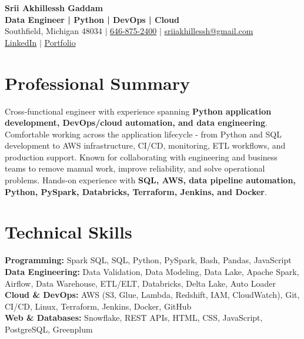 \documentclass[letterpaper,10pt]{article}
\begin{document}
\fontsize{9.35pt}{10.45pt}\selectfont

\begin{center}
    {\LARGE \textbf{Srii Akhillessh Gaddam}} \\[-1pt]
    \textbf{Data Engineer | Python | DevOps | Cloud} \\[2pt]
    Southfield, Michigan 48034 $|$
    \href{tel:6468752400}{646-875-2400} $|$
    \href{mailto:sriiakhillessh@gmail.com}{sriiakhillessh@gmail.com} \\[1pt]
    \href{https://www.linkedin.com/in/srii-akhiilessh-gaddam-b48668191/}{LinkedIn} $|$
    \href{https://sriiakhillesshg.github.io/portfolio/}{Portfolio}
\end{center}
\vspace{-8pt}

\section{Professional Summary}
\small{Cross-functional engineer with experience spanning \textbf{Python application development, DevOps/cloud automation, and data engineering}. Comfortable working across the application lifecycle - from Python and SQL development to AWS infrastructure, CI/CD, monitoring, ETL workflows, and production support. Known for collaborating with engineering and business teams to remove manual work, improve reliability, and solve operational problems. Hands-on experience with \textbf{SQL, AWS, data pipeline automation, Python, PySpark, Databricks, Terraform, Jenkins, and Docker}.}

\section{Technical Skills}
\small{
\textbf{Programming:} Spark SQL, SQL, Python, PySpark, Bash, Pandas, JavaScript \\
\textbf{Data Engineering:} Data Validation, Data Modeling, Data Lake, Apache Spark, Airflow, Data Warehouse, ETL/ELT, Databricks, Delta Lake, Auto Loader \\
\textbf{Cloud \& DevOps:} AWS (S3, Glue, Lambda, Redshift, IAM, CloudWatch), Git, CI/CD, Linux, Terraform, Jenkins, Docker, GitHub \\
\textbf{Web \& Databases:} Snowflake, REST APIs, HTML, CSS, JavaScript, PostgreSQL, Greenplum
}
\end{document}
